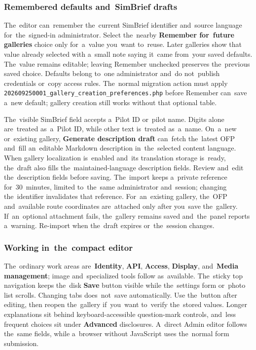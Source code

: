 \documentclass[11pt,a4paper]{article}
\newcommand{\ui}[1]{\textbf{#1}}
\newcommand{\codeword}[1]{\nolinkurl{#1}}
\begin{document}
\subsubsection{Remembered defaults and~SimBrief drafts}

The~editor can~remember the~current SimBrief identifier and~source language
for~the~signed-in administrator. Select the~nearby \ui{Remember for~future
galleries} choice only for~a~value you~want to~reuse. Later galleries show that
value already selected with a~small note saying it~came from~your saved
defaults. The~value remains editable; leaving Remember unchecked preserves
the~previous saved choice. Defaults belong to~one administrator and~do
not~publish credentials or~copy access rules. The~normal migration action must
apply \codeword{202609250001\_gallery\_creation\_preferences.php} before
Remember can~save a~new default; gallery creation still works without that
optional table.

The~visible SimBrief field accepts a~Pilot ID or~pilot name. Digits alone
are~treated as~a~Pilot ID, while other text is~treated as~a~name. On~a~new
or~existing gallery, \ui{Generate description draft} can~fetch the~latest OFP
and~fill an~editable Markdown description in~the~selected content language. When
gallery localization is~enabled and~its translation storage is~ready, the~draft
also fills the~maintained-language description fields. Review and~edit
the~description fields before saving. The~import keeps a~private reference
for~30~minutes, limited to~the~same administrator and~session; changing
the~identifier invalidates that reference. For~an~existing gallery, the~OFP
and~available route coordinates are~attached only after you~save the~gallery.
If~an~optional attachment fails, the~gallery remains saved and~the~panel reports
a~warning. Re-import when the~draft expires or~the~session changes.

\subsubsection{Working in~the~compact editor}

The~ordinary work areas are~\ui{Identity}, \ui{API}, \ui{Access}, \ui{Display},
and~\ui{Media management}; image and~specialized tools follow as~available.
The~sticky top navigation keeps the~disk \ui{Save} button visible while
the~settings form or~photo list scrolls. Changing tabs does~not~save
automatically. Use the~button after editing, then reopen the~gallery if~you~want
to~verify the~stored values. Longer explanations sit behind keyboard-accessible
question-mark controls, and~less frequent choices sit under \ui{Advanced}
disclosures. A~direct Admin editor follows the~same fields, while a~browser
without JavaScript uses the~normal form submission.
\end{document}
